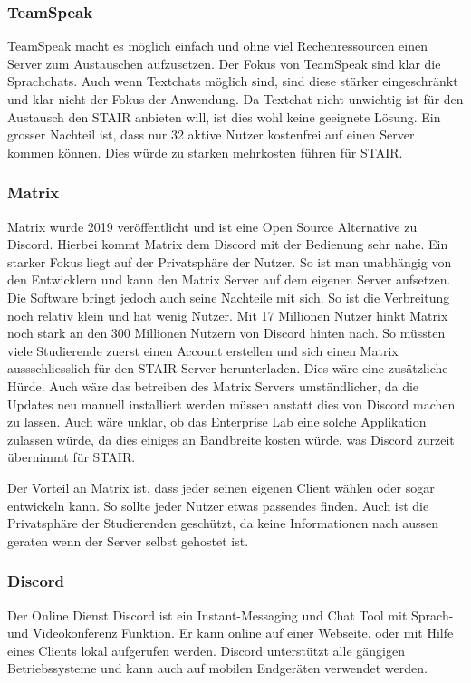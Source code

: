 \documentclass[a4paper, table]{article}
\begin{document}
\subsubsection*{TeamSpeak}

TeamSpeak macht es möglich einfach und ohne viel Rechenressourcen einen Server zum Austauschen aufzusetzen.
Der Fokus von TeamSpeak sind klar die Sprachchats.
Auch wenn Textchats möglich sind, sind diese stärker eingeschränkt und klar nicht der Fokus der Anwendung.
Da Textchat nicht unwichtig ist für den Austausch den STAIR anbieten will,
ist dies wohl keine geeignete Lösung.
Ein grosser Nachteil ist, dass nur 32 aktive Nutzer kostenfrei auf einen Server kommen können.
Dies würde zu starken mehrkosten führen für STAIR.\autocite{mockel_discord_2022}

\subsubsection*{Matrix}

Matrix wurde 2019 veröffentlicht und ist eine Open Source Alternative zu Discord.
Hierbei kommt Matrix dem Discord mit der Bedienung sehr nahe.
Ein starker Fokus liegt auf der Privatsphäre der Nutzer.
So ist man unabhängig von den Entwicklern und kann den Matrix Server auf dem eigenen Server aufsetzen.
Die Software bringt jedoch auch seine Nachteile mit sich.
So ist die Verbreitung noch relativ klein und hat wenig Nutzer.
Mit 17 Millionen Nutzer\autocite{noauthor_matrixorg_nodate} hinkt Matrix noch stark an den 300 Millionen Nutzern von Discord hinten nach.\autocite{david_curry_discord_2022}
So müssten viele Studierende zuerst einen Account erstellen und sich einen Matrix aussschliesslich für den STAIR Server herunterladen. Dies wäre eine zusätzliche Hürde.
Auch wäre das betreiben des Matrix Servers umständlicher, da die Updates neu manuell installiert werden müssen anstatt dies von Discord machen zu lassen.
Auch wäre unklar, ob das Enterprise Lab eine solche Applikation zulassen würde, da dies einiges an Bandbreite kosten würde, was Discord zurzeit übernimmt für STAIR.

Der Vorteil an Matrix ist, dass jeder seinen eigenen Client wählen oder sogar entwickeln kann.\autocite{noauthor_matrix_nodate}
So sollte jeder Nutzer etwas passendes finden.
Auch ist die Privatsphäre der Studierenden geschützt, da keine Informationen nach aussen geraten wenn der Server selbst gehostet ist.

\subsubsection{Discord}
Der Online Dienst Discord ist ein Instant-Messaging und Chat Tool mit Sprach- und Videokonferenz Funktion.
Er kann online auf einer Webseite, oder mit Hilfe eines Clients lokal aufgerufen werden.
Discord unterst\"utzt alle g\"angigen Betriebssysteme und kann auch auf mobilen Endger\"aten verwendet werden.
\end{document}
